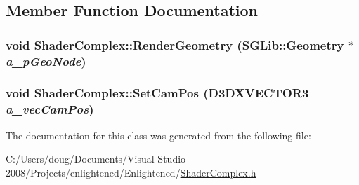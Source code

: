 \subsection{Member Function Documentation}
\hypertarget{class_shader_complex_aed3f29bdb3066be324b503adbcd6c120}{
\subsubsection[{RenderGeometry}]{\setlength{\rightskip}{0pt plus 5cm}void ShaderComplex::RenderGeometry (SGLib::Geometry $\ast$ {\em a\_\-pGeoNode})}}
\label{class_shader_complex_aed3f29bdb3066be324b503adbcd6c120}
\hypertarget{class_shader_complex_acc368371245476af139ec5eb20b7353d}{
\subsubsection[{SetCamPos}]{\setlength{\rightskip}{0pt plus 5cm}void ShaderComplex::SetCamPos (D3DXVECTOR3 {\em a\_\-vecCamPos})}}
\label{class_shader_complex_acc368371245476af139ec5eb20b7353d}


The documentation for this class was generated from the following file:\begin{DoxyCompactItemize}
\item 
C:/Users/doug/Documents/Visual Studio 2008/Projects/enlightened/Enlightened/\hyperlink{_shader_complex_8h}{ShaderComplex.h}\end{DoxyCompactItemize}
